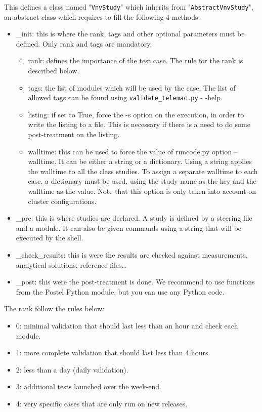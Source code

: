 This defines a class named "\verb!VnvStudy!" which inherits from
"\verb!AbstractVnvStudy!", an abstract class which requires to fill the
following 4 methods:
\begin{itemize}
\item \_init: this is where the rank, tags and other optional parameters must
  be defined. Only rank and tags are mandatory.
  \begin{itemize}
    \item rank: defines the importance of the test case. The rule for the rank
      is described below.
    \item tags: the list of modules which will be used by the case. The list
      of allowed tags can be found using \verb!validate_telemac.py! - -help.
    \item listing: if set to True, force the -s option on the execution, in
      order to write the listing to a file. This is necessary if there is a
      need to do some post-treatment on the listing.
    \item walltime: this can be used to force the value of runcode.py option
      --walltime. It can be either a string or a dictionary. Using a string
      applies the walltime to all the class studies. To assign a separate
      walltime to each case, a dictionary must be used, using the study name as
      the key and the walltime as the value. Note that this option is only
      taken into account on cluster configurations.
  \end{itemize}
\item \_pre: this is where studies are declared. A study is defined by a
  steering file and a module. It can also be given commands using a string that
  will be executed by the shell.
\item \_check\_results: this is were the results are checked against
  measurements, analytical solutions, reference files\ldots
\item \_post: this were the post-treatment is done. We recommend to use
  functions from the Postel Python module, but you can use any Python code.
\end{itemize}

The rank follow the rules below:
\begin{itemize}
\item 0: minimal validation that should last less than an hour and check each
  module.
\item 1: more complete validation that should last less than 4 hours.
\item 2: less than a day (daily validation).
\item 3: additional tests launched over the week-end.
\item 4: very specific cases that are only run on new releases.
\end{itemize}

